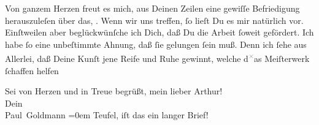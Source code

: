 \pstart
           Von ganzem Herzen freut es mich, aus Deinen Zeilen eine gewiſſe Befriedigung
                  herauszuleſen\strikeout{,} über das, \label{K_L02608-5v}\label{K_L02608-5}. Wenn wir uns treffen, ſo lieſt Du es mir
                  {\pb}natürlich vor. Einſtweilen aber beglückwünſche
               ich Dich, daß Du die Arbeit
               ſoweit gefördert. Ich habe ſo eine unbeſtimmte Ahnung, daß ſie gelungen ſein muß.
               Denn ich ſehe aus Allerlei, daß Deine Kunſt jene Reife und Ruhe gewinnt, welche d\substVorne{}\textsuperscript{\textcolor{gray}{×}}\substDazwischen{}a\substHinten{}s Meiſterwerk ſchaffen
                  helfen{\dotsfour}\pend
           
\pstart
           Sei von Herzen und in Treue begrüßt, mein lieber Arthur!{\\[\baselineskip]} Dein{\\[\baselineskip]}\spacefill\mbox{Paul Goldmann}\pend
           \leftskip=0em{}
\pstart
           \noindent{}Teufel, iſt das ein langer Brief!\pend
           \endnumbering{}  
      